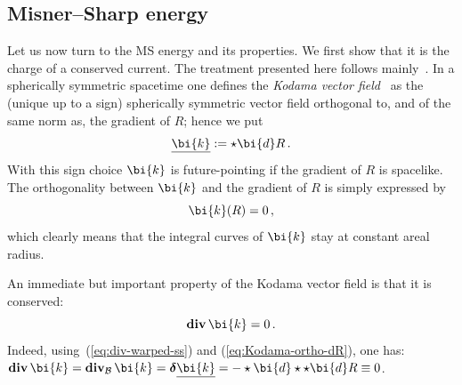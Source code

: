 \documentclass
[rmp,aps,twocolumn,showpacs,preprintnumbers,amsmath,amssymb]{revtex4}
\theoremstyle{plain}
\theoremstyle{definition}
\theoremstyle{remark}
\newcommand{\ul}[1]{\underline{#1}}
\newcommand{\br}[1]{\mathbf{#1}}              %
\DeclareMathOperator{\Div}{\br{div}}          %
\newcommand{\ed}{\bi{d}}                      %
\newcommand{\B}{\mathcal{B}}                      %
\newcommand{\bk}{\bi{k}}
\newcommand{\bdelta}{\boldsymbol{\delta}}
\begin{document}
\subsection{Misner--Sharp energy}
\label{sec:MS-energy}
%
Let us now turn to the MS energy and its properties. We first show that 
it is the charge of a conserved current. The treatment presented here 
follows mainly~\cite{Hayward:1996}. In a spherically symmetric spacetime one 
defines the \emph{Kodama vector field}~\cite{Kodama:1980} as the (unique up 
to a sign) spherically symmetric vector field orthogonal to, and of the 
same norm as, the gradient of $R$; hence we put 
%
\begin{equation}\label{eq:Kodama-def}
  \ul\bk := \star \ed R \,.
\end{equation}
%
With this sign choice $\bk$ is future-pointing if the gradient of $R$ is 
spacelike. The orthogonality between $\bk$ and the gradient of $R$ is 
simply expressed by 
%
\begin{equation}\label{eq:Kodama-ortho-dR}
  \bk(R) = 0 \,,
\end{equation}
%
which clearly means that the integral curves of $\bk$ stay at 
constant areal radius. 

An immediate but important property of the Kodama vector field 
is that it is conserved:
%
\begin{equation}\label{eq:Kodama-conserved}
  \Div\bk = 0 \,.
\end{equation}
%
Indeed, using~(\ref{eq:div-warped-ss}) and (\ref{eq:Kodama-ortho-dR}), 
one has: 
$\Div\bk = \Div_\B\bk = \bdelta\ul\bk = -\star\ed\star\star\ed R \equiv 0$.
\end{document}
